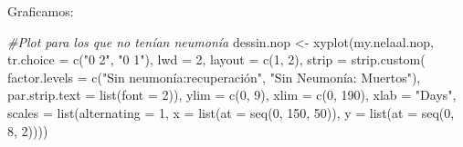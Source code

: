 \documentclass[
]{article}
\newenvironment{Shaded}{\begin{snugshade}}{\end{snugshade}}
\newcommand{\AttributeTok}[1]{\textcolor[rgb]{0.77,0.63,0.00}{#1}}
\newcommand{\CommentTok}[1]{\textcolor[rgb]{0.56,0.35,0.01}{\textit{#1}}}
\newcommand{\ConstantTok}[1]{\textcolor[rgb]{0.00,0.00,0.00}{#1}}
\newcommand{\DecValTok}[1]{\textcolor[rgb]{0.00,0.00,0.81}{#1}}
\newcommand{\FunctionTok}[1]{\textcolor[rgb]{0.00,0.00,0.00}{#1}}
\newcommand{\NormalTok}[1]{#1}
\newcommand{\OtherTok}[1]{\textcolor[rgb]{0.56,0.35,0.01}{#1}}
\newcommand{\SpecialCharTok}[1]{\textcolor[rgb]{0.00,0.00,0.00}{#1}}
\newcommand{\StringTok}[1]{\textcolor[rgb]{0.31,0.60,0.02}{#1}}
\begin{document}
Graficamos:

\begin{Shaded}
\end{Shaded}

\begin{Shaded}
\begin{Highlighting}[]
\CommentTok{\#Plot para los que no tenían neumonía}
\NormalTok{dessin.nop }\OtherTok{\textless{}{-}} \FunctionTok{xyplot}\NormalTok{(my.nelaal.nop, }\AttributeTok{tr.choice =} \FunctionTok{c}\NormalTok{(}\StringTok{"0 2"}\NormalTok{, }\StringTok{"0 1"}\NormalTok{), }\AttributeTok{lwd =} \DecValTok{2}\NormalTok{, }\AttributeTok{layout =} \FunctionTok{c}\NormalTok{(}\DecValTok{1}\NormalTok{, }\DecValTok{2}\NormalTok{), }\AttributeTok{strip =} \FunctionTok{strip.custom}\NormalTok{( }\AttributeTok{factor.levels =} \FunctionTok{c}\NormalTok{(}\StringTok{"Sin neumonía:recuperación"}\NormalTok{, }\StringTok{"Sin Neumonía: Muertos"}\NormalTok{), }\AttributeTok{par.strip.text =} \FunctionTok{list}\NormalTok{(}\AttributeTok{font =} \DecValTok{2}\NormalTok{)), }\AttributeTok{ylim =} \FunctionTok{c}\NormalTok{(}\DecValTok{0}\NormalTok{, }\DecValTok{9}\NormalTok{), }\AttributeTok{xlim =} \FunctionTok{c}\NormalTok{(}\DecValTok{0}\NormalTok{, }\DecValTok{190}\NormalTok{), }\AttributeTok{xlab =} \StringTok{"Days"}\NormalTok{, }\AttributeTok{scales =} \FunctionTok{list}\NormalTok{(}\AttributeTok{alternating =} \DecValTok{1}\NormalTok{, }\AttributeTok{x =} \FunctionTok{list}\NormalTok{(}\AttributeTok{at =} \FunctionTok{seq}\NormalTok{(}\DecValTok{0}\NormalTok{, }\DecValTok{150}\NormalTok{, }\DecValTok{50}\NormalTok{)), }\AttributeTok{y =} \FunctionTok{list}\NormalTok{(}\AttributeTok{at =} \FunctionTok{seq}\NormalTok{(}\DecValTok{0}\NormalTok{, }\DecValTok{8}\NormalTok{, }\DecValTok{2}\NormalTok{))))}
\end{Highlighting}
\end{Shaded}
\end{document}
